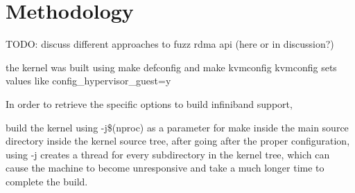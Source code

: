 \section{Methodology}


TODO: discuss different approaches to fuzz rdma api (here or in discussion?)



the kernel was built using make 
defconfig and make kvmconfig %
kvmconfig sets values like config\_hypervisor\_guest=y



In order to retrieve the specific options to build infiniband support,  


build the kernel using -j\$(nproc) as a parameter for make inside the main source directory
inside the kernel source tree, after going after the proper configuration, using -j creates a 
thread for every subdirectory in the kernel tree, which can cause the machine to become 
unresponsive and take a much longer time to complete the build. \cite{kroah-hartman06}